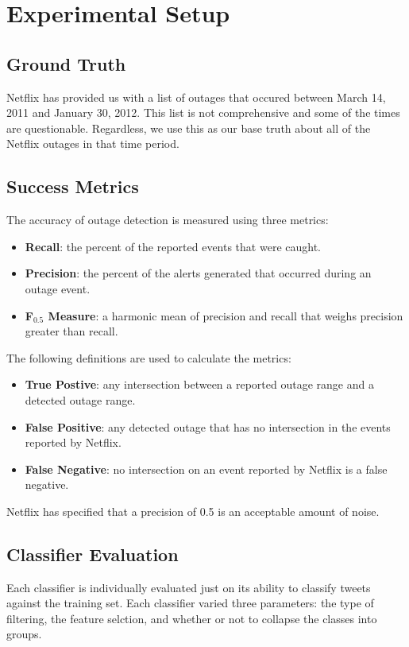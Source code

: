 \documentclass[12pt]{ucthesis}
\begin{document}
\chapter{Experimental Setup}
\label{experiments}

\section{Ground Truth}
\label{exp-truth}
Netflix has provided us with a list of outages that occured between March 14, 2011 and January 30, 2012.
This list is not comprehensive and some of the times are questionable. Regardless, we use this as our base truth
about all of the Netflix outages in that time period.

\section{Success Metrics}
\label{exp-metrics}
The accuracy of outage detection is measured using three metrics:

\begin{itemize}
   \item {\bf Recall}: the percent of the reported events that were caught.
   \item {\bf Precision}: the percent of the alerts generated that occurred during an outage event.
   \item {\bf F$_{0.5}$ Measure}: a harmonic mean of precision and recall that weighs precision greater than recall.
\end{itemize}

The following definitions are used to calculate the metrics:
\begin{itemize}
   \item {\bf True Postive}: any intersection between a reported outage range and a detected outage range.
   \item {\bf False Positive}: any detected outage that has no intersection in the events reported by Netflix.
   \item {\bf False Negative}: no intersection on an event reported by Netflix is a false negative.
\end{itemize}

Netflix has specified that a precision of 0.5 is an acceptable amount of noise.

\section{Classifier Evaluation}
\label{exp-classifier}
Each classifier is individually evaluated just on its ability to classify tweets against the training set.
Each classifier varied three parameters: the type of filtering, the feature selction, and whether or not to collapse the classes into groups.
\end{document}
